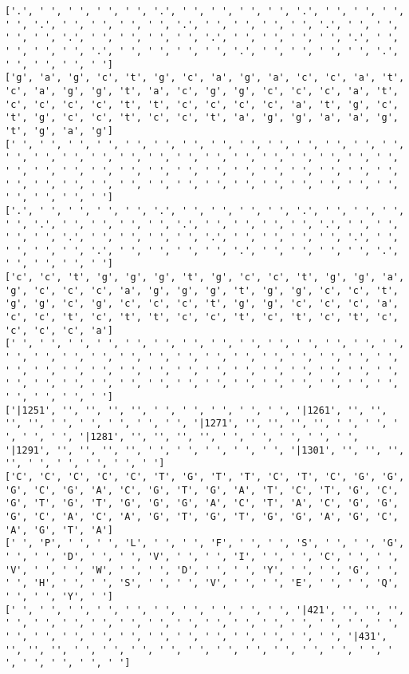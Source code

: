 \documentclass{article}
\begin{document}
\begin{Verbatim}
['.', ' ', ' ', ' ', ' ', '.', ' ', ' ', ' ', ' ', '.', ' ', ' ', ' ', ' ', '.', ' ', ' ', ' ', ' ', '.', ' ', ' ', ' ', ' ', '.', ' ', ' ', ' ', ' ', '.', ' ', ' ', ' ', ' ', '.', ' ', ' ', ' ', ' ', '.', ' ', ' ', ' ', ' ', '.', ' ', ' ', ' ', ' ', '.', ' ', ' ', ' ', ' ', '.', ' ', ' ', ' ', ' ']
['g', 'a', 'g', 'c', 't', 'g', 'c', 'a', 'g', 'a', 'c', 'c', 'a', 't', 'c', 'a', 'g', 'g', 't', 'a', 'c', 'g', 'g', 'c', 'c', 'c', 'a', 't', 'c', 'c', 'c', 'c', 't', 't', 'c', 'c', 'c', 'c', 'a', 't', 'g', 'c', 't', 'g', 'c', 'c', 't', 'c', 'c', 't', 'a', 'g', 'g', 'a', 'a', 'g', 't', 'g', 'a', 'g']
[' ', ' ', ' ', ' ', ' ', ' ', ' ', ' ', ' ', ' ', ' ', ' ', ' ', ' ', ' ', ' ', ' ', ' ', ' ', ' ', ' ', ' ', ' ', ' ', ' ', ' ', ' ', ' ', ' ', ' ', ' ', ' ', ' ', ' ', ' ', ' ', ' ', ' ', ' ', ' ', ' ', ' ', ' ', ' ', ' ', ' ', ' ', ' ', ' ', ' ', ' ', ' ', ' ', ' ', ' ', ' ', ' ', ' ', ' ', ' ']
['.', ' ', ' ', ' ', ' ', '.', ' ', ' ', ' ', ' ', '.', ' ', ' ', ' ', ' ', '.', ' ', ' ', ' ', ' ', '.', ' ', ' ', ' ', ' ', '.', ' ', ' ', ' ', ' ', '.', ' ', ' ', ' ', ' ', '.', ' ', ' ', ' ', ' ', '.', ' ', ' ', ' ', ' ', '.', ' ', ' ', ' ', ' ', '.', ' ', ' ', ' ', ' ', '.', ' ', ' ', ' ', ' ']
['c', 'c', 't', 'g', 'g', 'g', 't', 'g', 'c', 'c', 't', 'g', 'g', 'a', 'g', 'c', 'c', 'c', 'a', 'g', 'g', 'g', 't', 'g', 'g', 'c', 'c', 't', 'g', 'g', 'c', 'g', 'c', 'c', 'c', 't', 'g', 'g', 'c', 'c', 'c', 'a', 'c', 'c', 't', 'c', 't', 't', 'c', 'c', 't', 'c', 't', 'c', 't', 'c', 'c', 'c', 'c', 'a']
[' ', ' ', ' ', ' ', ' ', ' ', ' ', ' ', ' ', ' ', ' ', ' ', ' ', ' ', ' ', ' ', ' ', ' ', ' ', ' ', ' ', ' ', ' ', ' ', ' ', ' ', ' ', ' ', ' ', ' ', ' ', ' ', ' ', ' ', ' ', ' ', ' ', ' ', ' ', ' ', ' ', ' ', ' ', ' ', ' ', ' ', ' ', ' ', ' ', ' ', ' ', ' ', ' ', ' ', ' ', ' ', ' ', ' ', ' ', ' ']
['|1251', '', '', '', '', ' ', ' ', ' ', ' ', ' ', '|1261', '', '', '', '', ' ', ' ', ' ', ' ', ' ', '|1271', '', '', '', '', ' ', ' ', ' ', ' ', ' ', '|1281', '', '', '', '', ' ', ' ', ' ', ' ', ' ', '|1291', '', '', '', '', ' ', ' ', ' ', ' ', ' ', '|1301', '', '', '', '', ' ', ' ', ' ', ' ', ' ']
['C', 'C', 'C', 'C', 'C', 'T', 'G', 'T', 'T', 'C', 'T', 'C', 'G', 'G', 'G', 'C', 'G', 'A', 'C', 'G', 'T', 'G', 'A', 'T', 'C', 'T', 'G', 'C', 'G', 'T', 'G', 'T', 'G', 'G', 'G', 'A', 'C', 'T', 'A', 'C', 'G', 'G', 'G', 'C', 'A', 'C', 'A', 'G', 'T', 'G', 'T', 'G', 'G', 'A', 'G', 'C', 'A', 'G', 'T', 'A']
[' ', 'P', ' ', ' ', 'L', ' ', ' ', 'F', ' ', ' ', 'S', ' ', ' ', 'G', ' ', ' ', 'D', ' ', ' ', 'V', ' ', ' ', 'I', ' ', ' ', 'C', ' ', ' ', 'V', ' ', ' ', 'W', ' ', ' ', 'D', ' ', ' ', 'Y', ' ', ' ', 'G', ' ', ' ', 'H', ' ', ' ', 'S', ' ', ' ', 'V', ' ', ' ', 'E', ' ', ' ', 'Q', ' ', ' ', 'Y', ' ']
[' ', ' ', ' ', ' ', ' ', ' ', ' ', ' ', ' ', ' ', '|421', '', '', '', ' ', ' ', ' ', ' ', ' ', ' ', ' ', ' ', ' ', ' ', ' ', ' ', ' ', ' ', ' ', ' ', ' ', ' ', ' ', ' ', ' ', ' ', ' ', ' ', ' ', ' ', '|431', '', '', '', ' ', ' ', ' ', ' ', ' ', ' ', ' ', ' ', ' ', ' ', ' ', ' ', ' ', ' ', ' ', ' ']
  

\end{Verbatim}
\end{document}
